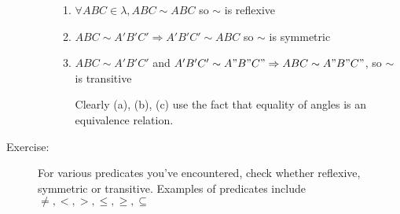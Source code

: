 \documentclass[10pt]{article}
\begin{document}
\begin{description}
\begin{enumerate}
			\begin{enumerate}
				\item $\forall ABC \in \lambda, ABC \sim ABC$ so $\sim$ is reflexive
				\item $ABC \sim A'B'C' \Rightarrow A'B'C' \sim ABC$ so $\sim$ is symmetric
				\item $ABC \sim A'B'C'$ and $A'B'C' \sim A"B"C" \Rightarrow ABC \sim A"B"C"$, so $\sim$ is transitive
				\item[Clearly] (a), (b), (c) use the fact that equality of angles is an equivalence relation.
			\end{enumerate}
		\end{enumerate}
		\item[Exercise:] For various predicates you've encountered, check whether reflexive, symmetric or transitive. Examples of predicates include $\neq, <, >, \leq, \geq, \subseteq$
	\end{description}
	
\end{document}

